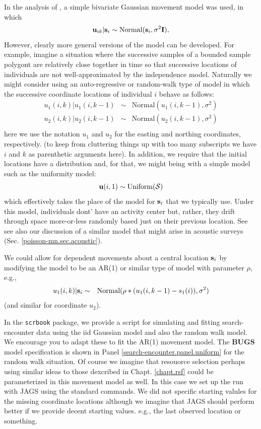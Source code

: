 In the analysis of \citet{royle_young:2008}, a simple bivariate
Gaussian movement model was used, in which
\[
 {\bf u}_{ik} | {\bf s}_{i} \sim \mbox{Normal}({\bf s}_{i}, \sigma^{2}{\bf I}),
\]
However, clearly more general versions of the model can be developed.
For example, imagine a situation where the successive samples of a
bounded sample polygont are relatively close together in time so that
successive locations of individuals are not well-approximated by the
independence model. Naturally we might consider using an
auto-regressive or random-walk type of model in which the successive
coordinate locations of individual $i$ behave as follows:
\begin{eqnarray*}
 u_{1}(i,k) | u_{1}(i,k-1) &\sim &  \mbox{Normal}( u_{1}(i,k-1),  \sigma^{2}) \\
 u_{2}(i,k) | u_{2}(i,k-1) &\sim &  \mbox{Normal}( u_{2}(i,k-1),  \sigma^{2}) \\
\end{eqnarray*}
here we use the notation $u_{1}$ and $u_{2}$ for the easting and
northing coordinates, respectively. (to keep from cluttering things up
with too many subscripts we have $i$ and $k$ as parenthetic arguments
here).   In addition, we require that the initial locations have a
distribution and, for that, we might being with a simple model such as
the uniformity model:
\[
 {\bf u}(i,1) \sim \mbox{Uniform}({\cal S})
\]
which effectively takes the place of the model for ${\bf s}_{i}$ that
we typically use. Under this model, individuals dont' have an activity
center but, rather, they drift through space more-or-less randomly
based just on their previous location. See \citet{ovaskainen:2004,
  ovaskainen:2008} see also our discussion of a similar model that
might arise in acoustic surveys (Sec. \ref{poisson-mn.sec.acoustic}).

We could allow for dependent movements about a central location ${\bf
  s}_{i}$ by modifying the model to be an AR(1) or similar type of
model with parameter $\rho$, e.g.,
\begin{eqnarray*}
 u_{1}(i,k) | {\bf s}_{i} &\sim &  \mbox{Normal}( \rho*( u_{1}(i,k-1)
 - s_{1}(i) ),  \sigma^{2}) \\
\end{eqnarray*}
(and similar for coordinate $u_{2}$).

In the \mbox{\tt scrbook} package, we provide a script for simulating
and fitting search-encounter data using the iid Gaussian model and
also the random walk model. We encourage you to adapt these to fit the
AR(1) movement model.  The {\bf BUGS} model specification is shown in
Panel \ref{search-encounter.panel.uniform} for the random walk
situation.  Of course we imagine that resouorce selection perhaps
using similar ideas to those dexcribed in Chapt. \ref{chapt.rsf} could
be parameterized in this movement model as well. In this case we set
up the run with JAGS using the standard commands. We did not specific
starting valules for the missing coordinate locations although we
imagine that JAGS should perform better if we provide decent starting
values. e.g., the last observed location or something.

